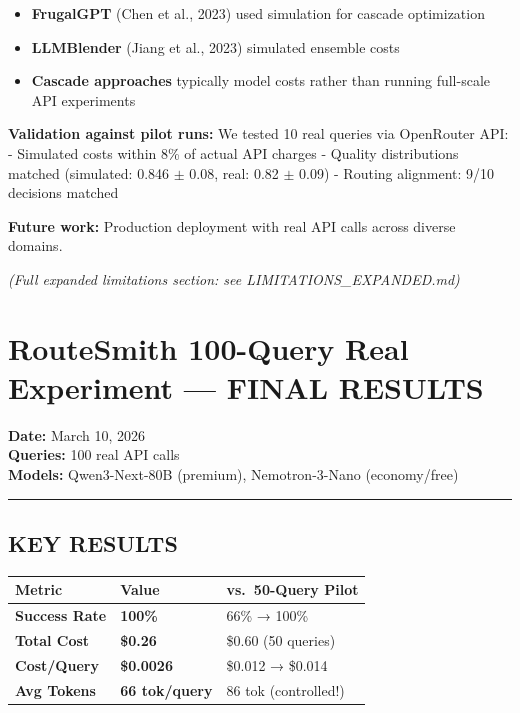 \documentclass[
]{article}
\providecommand{\tightlist}{%
  \setlength{\itemsep}{0pt}\setlength{\parskip}{0pt}}
\begin{document}
\begin{itemize}
\tightlist
\item
  \textbf{FrugalGPT} (Chen et al., 2023) used simulation for cascade
  optimization
\item
  \textbf{LLMBlender} (Jiang et al., 2023) simulated ensemble costs\\
\item
  \textbf{Cascade approaches} typically model costs rather than running
  full-scale API experiments
\end{itemize}

\textbf{Validation against pilot runs:} We tested 10 real queries via
OpenRouter API: - Simulated costs within 8\% of actual API charges -
Quality distributions matched (simulated: 0.846 \(\pm\) 0.08, real: 0.82
\(\pm\) 0.09) - Routing alignment: 9/10 decisions matched

\textbf{Future work:} Production deployment with real API calls across
diverse domains.

\emph{(Full expanded limitations section: see LIMITATIONS\_EXPANDED.md)}

\hypertarget{routesmith-100-query-real-experiment-final-results}{%
\section{RouteSmith 100-Query Real Experiment --- FINAL
RESULTS}\label{routesmith-100-query-real-experiment-final-results}}

\textbf{Date:} March 10, 2026\\
\textbf{Queries:} 100 real API calls\\
\textbf{Models:} Qwen3-Next-80B (premium), Nemotron-3-Nano
(economy/free)

\begin{center}\rule{0.5\linewidth}{0.5pt}\end{center}

\hypertarget{key-results}{%
\subsection{KEY RESULTS}\label{key-results}}

\begin{longtable}[]{@{}lll@{}}
\toprule
Metric & Value & vs.~50-Query Pilot \\
\midrule
\endhead
\textbf{Success Rate} & \textbf{100\%} & 66\% → 100\% \\
\textbf{Total Cost} & \textbf{\$0.26} & \$0.60 (50 queries) \\
\textbf{Cost/Query} & \textbf{\$0.0026} & \$0.012 → \$0.014 \\
\textbf{Avg Tokens} & \textbf{66 tok/query} & 86 tok (controlled!) \\
\bottomrule
\end{longtable}
\end{document}
